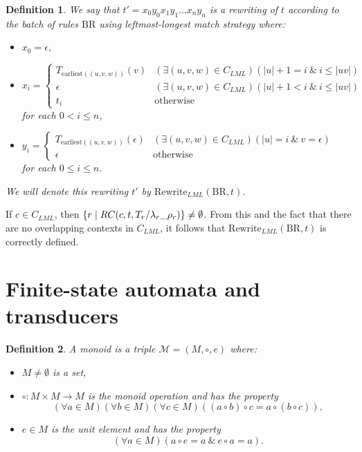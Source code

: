 \documentclass{article}
\newtheorem{definition}{Definition}[section]
\newcommand{\len}[1]{\ensuremath{\left| #1 \right|}}
\begin{document}
	\begin{definition} \label{def:rewriting}
		We say that $t' = x_0y_0x_1y_1\ldots x_{n}y_{n}$ is a rewriting of $t$ according to the batch of rules $\mathrm{BR}$ using leftmost-longest match strategy where:
		\begin{itemize}
			\item \( x_0 = \epsilon \),
			\item \( x_i = 
				\begin{cases}
					T_{\mathrm{earliest}((u, v, w))}(v) & (\exists (u, v, w) \in C_{LML})(\len{u}+1 = i\ \&\ i \le \len{uv}) \\
					\epsilon & (\exists (u, v, w) \in C_{LML})(\len{u}+1 < i\ \&\ i \le \len{uv}) \\
					t_i & \text{otherwise}
				\end{cases}
			\)\\
			for each $0 < i \le n$,
			\item \( y_i = 
				\begin{cases}
					T_{\mathrm{earliest}((u, v, w))}(\epsilon) & (\exists (u, v, w) \in C_{LML})(\len{u} = i\ \&\ v = \epsilon) \\
					\epsilon & \text{otherwise}
				\end{cases}
			\)\\
			for each $0 \le i \le n$.
		\end{itemize}
		We will denote this rewriting $t'$ by $\mathrm{Rewrite}_{LML}(\mathrm{BR}, t)$.
	\end{definition}

	If $c \in C_{LML}$, then \( \{r \mid RC(c, t, \crr[T_r][\lambda_r][\rho_r])\} \ne \emptyset \).
	From this and the fact that there are no overlapping contexts in $C_{LML}$, it follows that $\mathrm{Rewrite}_{LML}(\mathrm{BR}, t)$ is correctly defined.
	
	\section{Finite-state automata and transducers} \label{section:FSA}
	\begin{definition} \label{def:monoid}
		A monoid is a triple $\mathcal{M} = (M, \circ, e)$ where:
		\begin{itemize}
			\item $M\ne\emptyset$ is a set,
			\item $\circ: M\times M\to M$ is the monoid operation and has the property
				\[ (\forall a\in M)(\forall b\in M)(\forall c\in M)((a\circ b)\circ c = a\circ(b\circ c)), \]
			\item $e\in M$ is the unit element and has the property
				\[ (\forall a\in M)(a\circ e = a\ \&\ e\circ a = a). \]
		\end{itemize}
	\end{definition}
\end{document}
